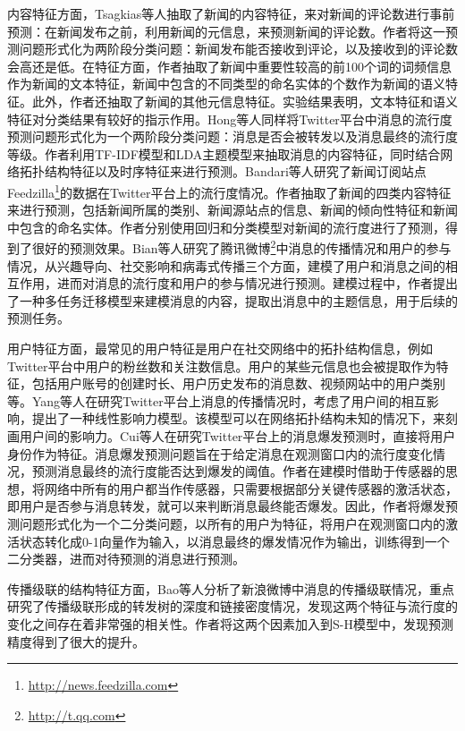 内容特征方面，Tsagkias等人\citep{tsagkias2009predicting}抽取了新闻的内容特征，来对新闻的评论数进行事前预测：在新闻发布之前，利用新闻的元信息，来预测新闻的评论数。作者将这一预测问题形式化为两阶段分类问题：新闻发布能否接收到评论，以及接收到的评论数会高还是低。在特征方面，作者抽取了新闻中重要性较高的前100个词的词频信息作为新闻的文本特征，新闻中包含的不同类型的命名实体的个数作为新闻的语义特征。此外，作者还抽取了新闻的其他元信息特征。实验结果表明，文本特征和语义特征对分类结果有较好的指示作用。Hong等人\citep{hong2011predicting}同样将Twitter平台中消息的流行度预测问题形式化为一个两阶段分类问题：消息是否会被转发以及消息最终的流行度等级。作者利用TF-IDF模型和LDA主题模型\citep{blei2003latent}来抽取消息的内容特征，同时结合网络拓扑结构特征以及时序特征来进行预测。Bandari等人\citep{bandari2012pulse}研究了新闻订阅站点Feedzilla\footnote{\url{http://news.feedzilla.com}}的数据在Twitter平台上的流行度情况。作者抽取了新闻的四类内容特征来进行预测，包括新闻所属的类别、新闻源站点的信息、新闻的倾向性特征和新闻中包含的命名实体。作者分别使用回归和分类模型对新闻的流行度进行了预测，得到了很好的预测效果。Bian等人\citep{bian2014predicting}研究了腾讯微博\footnote{\url{http://t.qq.com}}中消息的传播情况和用户的参与情况，从兴趣导向、社交影响和病毒式传播三个方面，建模了用户和消息之间的相互作用，进而对消息的流行度和用户的参与情况进行预测。建模过程中，作者提出了一种多任务迁移模型来建模消息的内容，提取出消息中的主题信息，用于后续的预测任务。

用户特征方面，最常见的用户特征是用户在社交网络中的拓扑结构信息，例如Twitter平台中用户的粉丝数和关注数信息\citep{gupta2012predicting,zhao2013short,kupavskii2013predicting,kong2014predicting}。用户的某些元信息也会被提取作为特征，包括用户账号的创建时长、用户历史发布的消息数\citep{suh2010want}、视频网站中的用户类别\citep{borghol2012untold}等。Yang等人\citep{yang2010modeling}在研究Twitter平台上消息的传播情况时，考虑了用户间的相互影响，提出了一种线性影响力模型。该模型可以在网络拓扑结构未知的情况下，来刻画用户间的影响力。Cui等人\citep{cui2013cascading}在研究Twitter平台上的消息爆发预测时，直接将用户身份作为特征。消息爆发预测问题旨在于给定消息在观测窗口内的流行度变化情况，预测消息最终的流行度能否达到爆发的阈值。作者在建模时借助于传感器的思想，将网络中所有的用户都当作传感器，只需要根据部分关键传感器的激活状态，即用户是否参与消息转发，就可以来判断消息最终能否爆发。因此，作者将爆发预测问题形式化为一个二分类问题，以所有的用户为特征，将用户在观测窗口内的激活状态转化成0-1向量作为输入，以消息最终的爆发情况作为输出，训练得到一个二分类器，进而对待预测的消息进行预测。

传播级联的结构特征方面，Bao等人\citep{bao2013popularity}分析了新浪微博中消息的传播级联情况，重点研究了传播级联形成的转发树的深度和链接密度情况，发现这两个特征与流行度的变化之间存在着非常强的相关性。作者将这两个因素加入到S-H模型中，发现预测精度得到了很大的提升。

